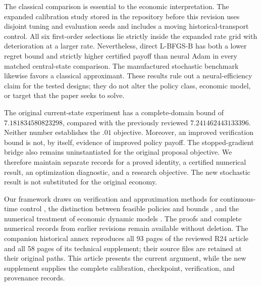 The classical comparison is essential to the economic interpretation. The expanded calibration study stored in the repository before this revision uses disjoint tuning and evaluation seeds and includes a moving historical-transport control. All six first-order selections lie strictly inside the expanded rate grid with deterioration at a larger rate. Nevertheless, direct L-BFGS-B has both a lower regret bound and strictly higher certified payoff than neural Adam in every matched central-state comparison. The manufactured stochastic benchmark likewise favors a classical approximant. These results rule out a neural-efficiency claim for the tested designs; they do not alter the policy class, economic model, or target that the paper seeks to solve.

The original current-state experiment has a complete-domain bound of $7.181834580823298$, compared with the previously reviewed $7.241462443133396$. Neither number establishes the $.01$ objective. Moreover, an improved verification bound is not, by itself, evidence of improved policy payoff. The stopped-gradient bridge also remains uninstantiated for the original proposal objective. We therefore maintain separate records for a proved identity, a certified numerical result, an optimization diagnostic, and a research objective. The new stochastic result is not substituted for the original economy.

Our framework draws on verification and approximation methods for continuous-time control \citep{KushnerDupuis2001}, the distinction between feasible policies and bounds \citep{BrownSmithSun2010}, and the numerical treatment of economic dynamic models \citep{Judd1998,BrummScheidegger2017}. The proofs and complete numerical records from earlier revisions remain available without deletion. The companion historical annex reproduces all 93 pages of the reviewed R24 article and all 58 pages of its technical supplement; their source files are retained at their original paths. This article presents the current argument, while the new supplement supplies the complete calibration, checkpoint, verification, and provenance records.

